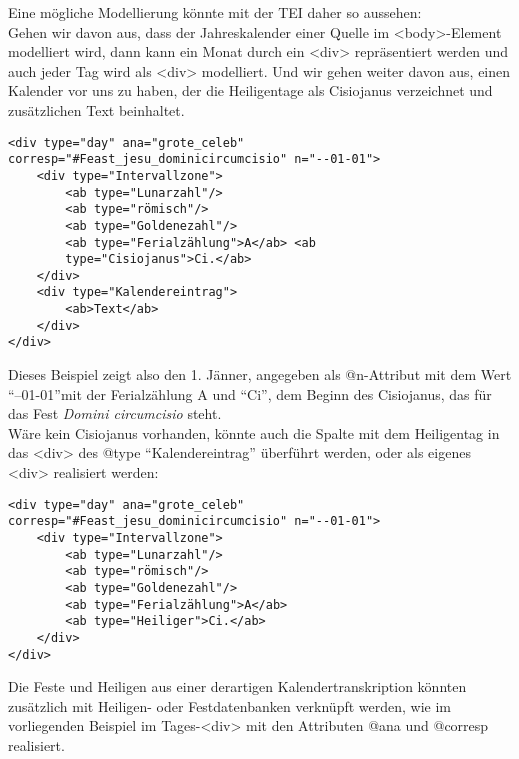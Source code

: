\documentclass{article}
\begin{document}
        Eine mögliche Modellierung könnte mit der TEI daher so aussehen:\\
            
        Gehen wir davon aus, dass der Jahreskalender einer Quelle im <body>-Element modelliert wird, dann kann ein
                  Monat durch ein <div> repräsentiert werden
                  und auch jeder Tag wird als <div> modelliert.
                  Und wir gehen weiter davon aus, einen Kalender vor uns zu haben, der die
                  Heiligentage als Cisiojanus verzeichnet und zusätzlichen Text beinhaltet.\\
            
        \begin{verbatim}<div type="day" ana="grote_celeb" corresp="#Feast_jesu_dominicircumcisio" n="--01-01">
    <div type="Intervallzone">
        <ab type="Lunarzahl"/>
        <ab type="römisch"/>
        <ab type="Goldenezahl"/>
        <ab type="Ferialzählung">A</ab> <ab
        type="Cisiojanus">Ci.</ab>
    </div> 
    <div type="Kalendereintrag">
        <ab>Text</ab> 
    </div> 
</div>\end{verbatim}Dieses Beispiel zeigt also den 1. Jänner, angegeben als @n-Attribut mit dem Wert “--01-01”mit der Ferialzählung A und “Ci”, dem
                  Beginn des Cisiojanus, das für das Fest \emph{Domini circumcisio}
                  steht. \\
            
        Wäre kein Cisiojanus vorhanden, könnte auch die Spalte mit dem Heiligentag in das
                     <div> des @type “Kalendereintrag” überführt werden, oder als eigenes <div> realisiert werden:\\
            
        \begin{verbatim}<div type="day" ana="grote_celeb" corresp="#Feast_jesu_dominicircumcisio" n="--01-01">
    <div type="Intervallzone">
        <ab type="Lunarzahl"/>
        <ab type="römisch"/>
        <ab type="Goldenezahl"/>
        <ab type="Ferialzählung">A</ab>
        <ab type="Heiliger">Ci.</ab>
    </div>
</div>\end{verbatim}Die Feste und Heiligen aus einer derartigen Kalendertranskription könnten
                  zusätzlich mit Heiligen- oder Festdatenbanken verknüpft werden, wie im
                  vorliegenden Beispiel im Tages-<div> mit den
                  Attributen @ana und @corresp realisiert. \\
            
\end{document}
